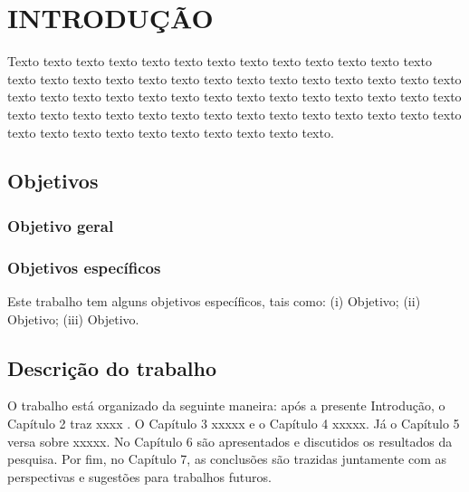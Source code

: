\chapter{INTRODUÇÃO}  \label{cap:intro} 

Texto texto texto texto texto texto texto texto texto texto texto texto texto texto texto texto texto texto texto texto texto texto texto texto texto texto texto texto texto texto texto texto texto texto texto texto texto texto texto texto texto texto texto texto texto texto texto texto texto texto texto texto texto texto texto texto texto texto texto texto texto texto texto texto texto.



\section{Objetivos}

\subsection{Objetivo geral}


\subsection{Objetivos específicos}

Este trabalho tem alguns objetivos específicos, tais como: (i) Objetivo; (ii) Objetivo; (iii) Objetivo.


\section{Descrição do trabalho}



O trabalho está organizado da seguinte maneira: após a presente Introdução, o Capítulo 2 traz xxxx . O Capítulo 3 xxxxx e o Capítulo 4 xxxxx. Já o Capítulo 5 versa sobre xxxxx. No Capítulo 6 são apresentados e discutidos os resultados da pesquisa. Por fim, no Capítulo 7, as conclusões são trazidas juntamente com as perspectivas e sugestões para trabalhos futuros. 

